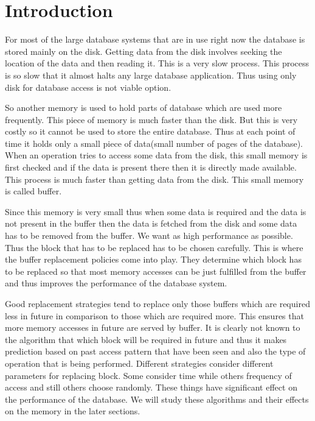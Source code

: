 \section*{{Introduction}}

For most of the large database systems that are in use right now the database is stored mainly on the disk. Getting data from the disk involves seeking the location of the data and then reading it. This is a very slow process. This process is so slow that it almost halts any large database application. Thus using only disk for database access is not viable option. 

So another memory is used to hold parts of database which are used more frequently. This piece of memory is much faster than the disk. But this is very costly so it cannot be used to store the entire database. Thus at each point of time it holds only a small piece of data(small number of pages of the database). When an operation tries to access some data from the disk, this small memory is first checked and if the data is present there then it is directly made available. This process is much faster than getting data from the disk. This small memory is called buffer. 

Since this memory is very small thus when some data is required and the data is not present in the buffer then the data is fetched from the disk and some data has to be removed from the buffer. We want as high performance as possible. Thus the block that has to be replaced has to be chosen carefully. This is where the buffer replacement policies come into play. They determine which block has to be replaced so that most memory accesses can be just fulfilled from the buffer and thus improves the  performance of the database system.

Good replacement strategies tend to replace only those buffers which are required less in future in comparison to those which are required more. This ensures that more memory accesses in future are served by buffer. It is clearly not known to the algorithm that which block will be required in future and thus it makes prediction based on past access pattern that have been seen and also the type of operation that is being performed. Different strategies consider different parameters for replacing block. Some consider time while others frequency of access and still others choose randomly. These things have significant effect on the performance of the database. We will study these algorithms and their effects on the memory in the later sections.

